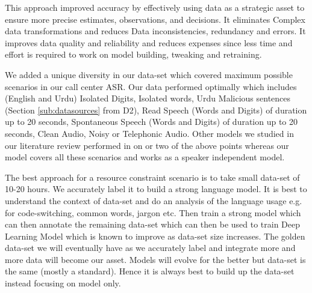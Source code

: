 \documentclass{article}
\begin{document}
This approach improved accuracy by effectively using data as a strategic asset to ensure more precise estimates, observations, and decisions. It eliminates Complex data transformations and reduces Data inconsistencies, redundancy and errors. It improves data quality and reliability and reduces expenses since less time and effort is required to work on model building, tweaking and retraining.


We added a unique diversity in our data-set which covered maximum possible scenarios in our call center ASR. Our data performed optimally which includes (English and Urdu) Isolated Digits, Isolated words, Urdu Malicious sentences (Section \ref{sub:datasources} from D2), Read Speech (Words and Digits) of duration up to 20 seconds, Spontaneous Speech (Words and Digits) of duration up to 20 seconds, Clean Audio, Noisy or Telephonic Audio. Other models we studied in our literature review performed in on or two of the above points whereas our model covers all these scenarios and works as a speaker independent model. 

The best approach for a resource constraint scenario is to take small data-set of 10-20 hours. We accurately label it to build a strong language model. It is best to understand the context of data-set and do an analysis of the language usage e.g. for code-switching, common words, jargon etc. Then train a strong model which can then annotate the remaining data-set which can then be used to train Deep Learning Model which is known to improve as data-set size increases. The golden data-set we will eventually have as we accurately label and integrate more and more data will become our asset. Models will evolve for the better but data-set is the same (mostly a standard). Hence it is always best to build up the data-set instead focusing on model only.
\end{document}
